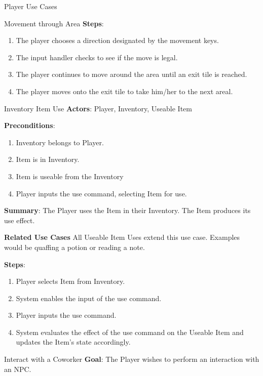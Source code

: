 \documentclass[12pt]{report}
\begin{document}
\begin{section}{Player Use Cases}
\begin{subsection}{Movement through Area}
      \textbf{Steps}:
      \begin{enumerate}
        \item The player chooses a direction designated by the movement keys.
        \item The input handler checks to see if the move is legal.
        \item The player continues to move around the area until an exit tile is reached.
        \item The player moves onto the exit tile to take him/her to the next areal.
      \end{enumerate}
    \end{subsection}
    
    \begin{subsection}{Inventory Item Use}
      \textbf{Actors}:
      Player, Inventory, Useable Item

      \textbf{Preconditions}:
      \begin{enumerate}
      	\item Inventory belongs to Player.
      	\item Item is in Inventory.
      	\item Item is useable from the Inventory
      	\item Player inputs the use command, selecting Item for use.
      \end{enumerate}

      \textbf{Summary}:
      The Player uses the Item in their Inventory. The Item produces its
      use effect.

      \textbf{Related Use Cases}
      All Useable Item Uses extend this use case. Examples would be quaffing
      a potion or reading a note.

      \textbf{Steps}:
      \begin{enumerate}
        \item Player selects Item from Inventory.
        \item System enables the input of the use command.
        \item Player inputs the use command.
        \item System evaluates the effect of the use command on the
        Useable Item and updates the Item's state accordingly.
      \end{enumerate}
    \end{subsection}


    \begin{subsection}{Interact with a Coworker}
      \textbf{Goal}:
      The Player wishes to perform an interaction with an NPC.
      

\end{subsection}
\end{section}
\end{document}
